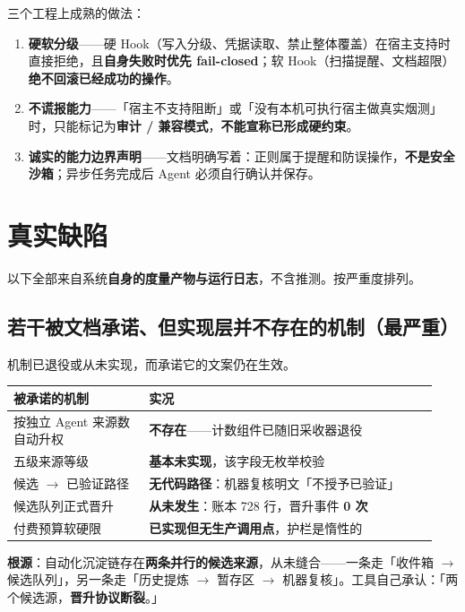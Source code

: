 \documentclass[11pt,a4paper]{ctexart}
\begin{document}
三个工程上成熟的做法：

\begin{enumerate}
  \item \textbf{硬软分级}——硬 Hook（写入分级、凭据读取、禁止整体覆盖）在宿主支持时直接拒绝，且\textbf{自身失败时优先 fail-closed}；软 Hook（扫描提醒、文档超限）\textbf{绝不回滚已经成功的操作}。
  \item \textbf{不谎报能力}——「宿主不支持阻断」或「没有本机可执行宿主做真实烟测」时，只能标记为\textbf{审计 / 兼容模式}，\textbf{不能宣称已形成硬约束}。
  \item \textbf{诚实的能力边界声明}——文档明确写着：正则属于提醒和防误操作，\textbf{不是安全沙箱}；异步任务完成后 Agent 必须自行确认并保存。
\end{enumerate}

\section{真实缺陷}

以下全部来自系统\textbf{自身的度量产物与运行日志}，不含推测。按严重度排列。

\subsection{若干被文档承诺、但实现层并不存在的机制（最严重）}

机制已退役或从未实现，而承诺它的文案仍在生效。

\begin{center}
\begin{tabular}{@{}p{0.30\linewidth}p{0.64\linewidth}@{}}
\toprule
\textbf{被承诺的机制} & \textbf{实况} \\
\midrule
按独立 Agent 来源数自动升权 & \textbf{不存在}——计数组件已随旧采收器退役 \\
五级来源等级 & \textbf{基本未实现}，该字段无枚举校验 \\
候选 $\rightarrow$ 已验证路径 & \textbf{无代码路径}：机器复核明文「不授予已验证」 \\
候选队列正式晋升 & \textbf{从未发生}：账本 728 行，晋升事件 \textbf{0 次} \\
付费预算软硬限 & \textbf{已实现但无生产调用点}，护栏是惰性的 \\
\bottomrule
\end{tabular}
\end{center}

\textbf{根源}：自动化沉淀链存在\textbf{两条并行的候选来源}，从未缝合——一条走「收件箱 $\rightarrow$ 候选队列」，另一条走「历史提炼 $\rightarrow$ 暂存区 $\rightarrow$ 机器复核」。工具自己承认：「两个候选源，\textbf{晋升协议断裂}。」
\end{document}
